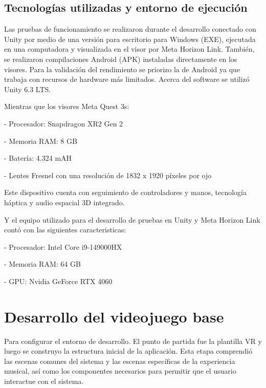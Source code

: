 \subsection{Tecnologías utilizadas y entorno de ejecución}

Las pruebas de funcionamiento se realizaron durante el desarrollo conectado con Unity por medio de una versión para escritorio para Windows (EXE), ejecutada en una computadora y visualizada en el visor por Meta Horizon Link. También, se realizaron compilaciones Android (APK) instaladas directamente en los visores. Para la validación del rendimiento se priorizo la de Android ya que trabaja con recursos de hardware más limitados. 
Acerca del software se utilizó Unity 6.3 LTS.


Mientras que los visores Meta Quest 3s: 

- Procesador: Snapdragon XR2 Gen 2

- Memoria RAM: 8 GB

- Batería: 4.324 mAH

- Lentes Fresnel con una resolución de 1832 x 1920 píxeles por ojo

Este dispositivo cuenta con seguimiento de controladores y manos, tecnología háptica y audio espacial 3D integrado. \cite{metaquest}


Y el equipo utilizado para el desarrollo de pruebas en Unity y Meta Horizon Link contó con las siguientes caracteristicas: 

- Procesador: Intel Core i9-149000HX

- Memoria RAM: 64 GB

- GPU: Nvidia GeForce RTX 4060


\section{Desarrollo del videojuego base}
Para configurar el entorno de desarrollo. El punto de partida fue la plantilla VR y luego se construyo la estructura inicial de la aplicación. Esta etapa comprendió las escenas comunes del sistema y las escenas específicas de la experiencia musical, así como los componentes necesarios para permitir que el usuario interactue con el sistema. 

